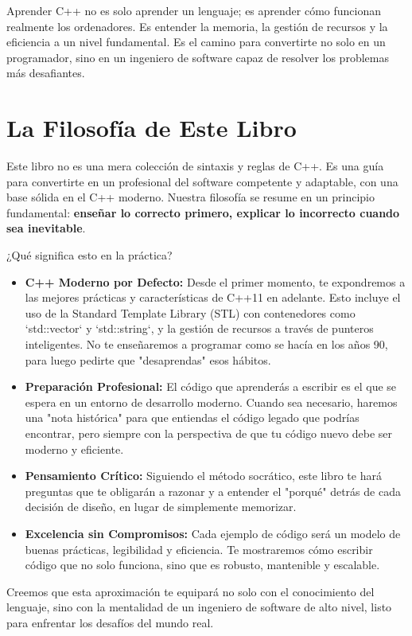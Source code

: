 Aprender C++ no es solo aprender un lenguaje; es aprender cómo funcionan realmente los ordenadores. Es entender la memoria, la gestión de recursos y la eficiencia a un nivel fundamental. Es el camino para convertirte no solo en un programador, sino en un ingeniero de software capaz de resolver los problemas más desafiantes.

\section{La Filosofía de Este Libro}
\label{sec:filosofia}

Este libro no es una mera colección de sintaxis y reglas de C++. Es una guía para convertirte en un profesional del software competente y adaptable, con una base sólida en el C++ moderno. Nuestra filosofía se resume en un principio fundamental: \textbf{enseñar lo correcto primero, explicar lo incorrecto cuando sea inevitable}.

¿Qué significa esto en la práctica?
\begin{itemize}
    \item \textbf{C++ Moderno por Defecto:} Desde el primer momento, te expondremos a las mejores prácticas y características de C++11 en adelante. Esto incluye el uso de la Standard Template Library (STL) con contenedores como `std::vector` y `std::string`, y la gestión de recursos a través de punteros inteligentes. No te enseñaremos a programar como se hacía en los años 90, para luego pedirte que "desaprendas" esos hábitos.
    \item \textbf{Preparación Profesional:} El código que aprenderás a escribir es el que se espera en un entorno de desarrollo moderno. Cuando sea necesario, haremos una "nota histórica" para que entiendas el código legado que podrías encontrar, pero siempre con la perspectiva de que tu código nuevo debe ser moderno y eficiente.
    \item \textbf{Pensamiento Crítico:} Siguiendo el método socrático, este libro te hará preguntas que te obligarán a razonar y a entender el "porqué" detrás de cada decisión de diseño, en lugar de simplemente memorizar.
    \item \textbf{Excelencia sin Compromisos:} Cada ejemplo de código será un modelo de buenas prácticas, legibilidad y eficiencia. Te mostraremos cómo escribir código que no solo funciona, sino que es robusto, mantenible y escalable.
\end{itemize}

Creemos que esta aproximación te equipará no solo con el conocimiento del lenguaje, sino con la mentalidad de un ingeniero de software de alto nivel, listo para enfrentar los desafíos del mundo real.

